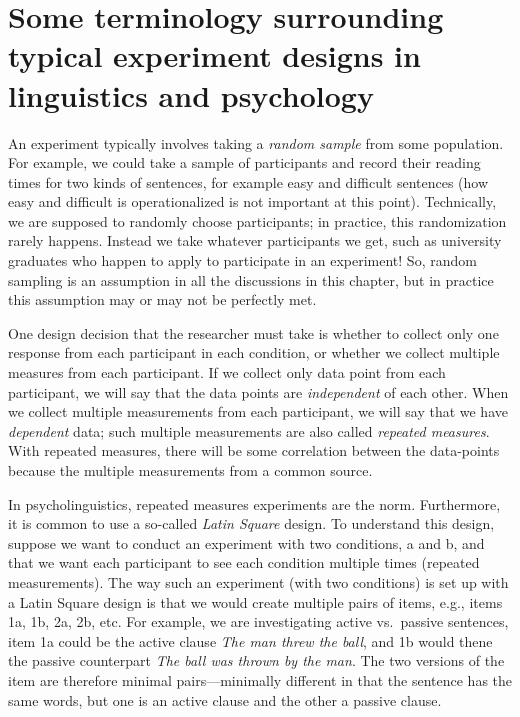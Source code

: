 \documentclass[12pt,]{krantz}
\begin{document}
\hypertarget{some-terminology-surrounding-typical-experiment-designs-in-linguistics-and-psychology}{%
\section{Some terminology surrounding typical experiment designs in linguistics and psychology}\label{some-terminology-surrounding-typical-experiment-designs-in-linguistics-and-psychology}}

An experiment typically involves taking a \emph{random sample} from some population. For example, we could take a sample of participants and record their reading times for two kinds of sentences, for example easy and difficult sentences (how easy and difficult is operationalized is not important at this point). Technically, we are supposed to randomly choose participants; in practice, this randomization rarely happens. Instead we take whatever participants we get, such as university graduates who happen to apply to participate in an experiment! So, random sampling is an assumption in all the discussions in this chapter, but in practice this assumption may or may not be perfectly met.

One design decision that the researcher must take is whether to collect only one response from each participant in each condition, or whether we collect multiple measures from each participant. If we collect only data point from each participant, we will say that the data points are \emph{independent} of each other. When we collect multiple measurements from each participant, we will say that we have \emph{dependent} data; such multiple measurements are also called \emph{repeated measures}. With repeated measures, there will be some correlation between the data-points because the multiple measurements from a common source.

In psycholinguistics, repeated measures experiments are the norm. Furthermore, it is common to use a so-called \emph{Latin Square} design. To understand this design, suppose we want to conduct an experiment with two conditions, a and b, and that we want each participant to see each condition multiple times (repeated measurements). The way such an experiment (with two conditions) is set up with a Latin Square design is that we would create multiple pairs of items, e.g., items 1a, 1b, 2a, 2b, etc. For example, we are investigating active vs.~passive sentences, item 1a could be the active clause \emph{The man threw the ball}, and 1b would thene the passive counterpart \emph{The ball was thrown by the man}. The two versions of the item are therefore minimal pairs---minimally different in that the sentence has the same words, but one is an active clause and the other a passive clause.
\end{document}
